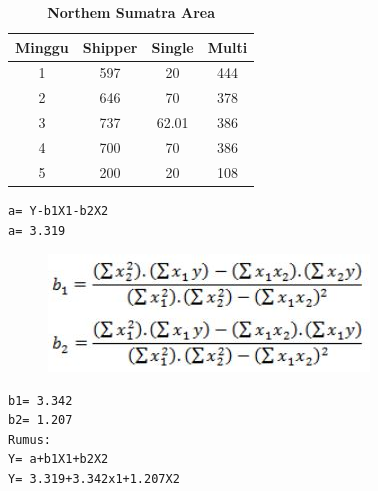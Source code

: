 \begin{enumerate}
\begin{table}[!ht]
 \centering
  \caption{\textbf{Northem Sumatra Area}}
\begin{tabular}{|c|c|c|c|}
\hline
Minggu & Shipper & Single & Multi \\ \hline
1      & 597     & 20     & 444   \\ \hline
2      & 646     & 70     & 378   \\ \hline
3      & 737     & 62.01     & 386   \\ \hline
4      & 700     & 70     & 386   \\ \hline
5      & 200     & 20     & 108   \\ \hline
\end{tabular}
\end{table}
\newpage \begin{lstlisting}
a= Y-b1X1-b2X2      
a= 3.319
\end{lstlisting}
\begin{figure}[!htbp]
\includegraphics[scale=0.6]{figures/b1b2.JPG}
    \label{Figure4}
\end{figure}
\begin{lstlisting}
b1= 3.342
b2= 1.207
Rumus:
Y= a+b1X1+b2X2
Y= 3.319+3.342x1+1.207X2
\end{lstlisting}


\end{enumerate}
